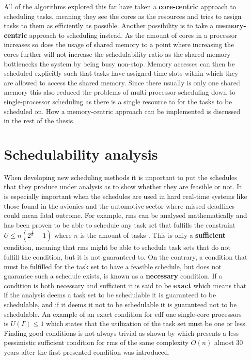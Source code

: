 \documentclass{kththesis}
\begin{document}
All of the algorithms explored this far have taken a \textbf{core-centric} approach to scheduling tasks,
meaning they see the cores as the resources and tries to assign tasks to them as efficiently as
possible. Another possibility is to take a \textbf{memory-centric} approach to scheduling instead.
As the amount of cores in a processor increases so does the usage of shared memory to a point where
increasing the cores further will not increase the schedulability ratio as the shared memory
bottlenecks the system by being busy non-stop. Memory accesses can then be scheduled explicitly such
that tasks have assigned time slots within which they are allowed to access the shared memory. Since
there usually is only one shared memory this also reduced the problems of multi-processor scheduling
down to  single-processor scheduling as there is a single resource to for the tasks to be scheduled
on. How a memory-centric approach can be implemented is discussed in the rest of the thesis.

\section{Schedulability analysis} \label{sec:schedulability_analysis}

When developing new scheduling methods it is important to put the schedules that they produce under
analysis as to show whether they are feasible or not. It is especially important when the schedules
are used in hard real-time systems like those found in the avionics and the automotive sector where
missed deadlines could mean fatal outcome. For example, \acrshort{rms} can be analysed
mathematically and has been proven to be able to schedule any task set that fulfills the constraint
$ U \le n(2^{\frac{1}{n}}-1) $ where $ n $ is the amount of tasks \parencite{liu_scheduling_1973}.
This is only a \textbf{sufficient} condition, meaning that \acrshort{rms} might be able to schedule
task sets that do not fulfill the condition, but it is not guaranteed to. On the contrary, a
condition that must be fulfilled for the task set to have a feasible schedule, but does not
guarantee such a schedule exists, is known as a \textbf{necessary} condition. If a condition is both
necessary and sufficient it is said to be \textbf{exact} which means that if the analysis deems a
task set to be schedulable it is guaranteed to be schedulable, and if it deems it not to be
schedulable it is guaranteed not to be schedulable. An example of an exact condition for
\acrshort{edf} one single-core processors is $ U(\Gamma) \leq 1 $ which states that the utilization
of the task set must be one or less. Finding good conditions is not always trivial as shown by
\parencite{bini_hyperbolic_2001} which presents a less pessimistic sufficient condition for
\acrshort{rms} of the same complexity $ O(n) $ almost 30 years after the first presented condition
was introduced. 
\end{document}

